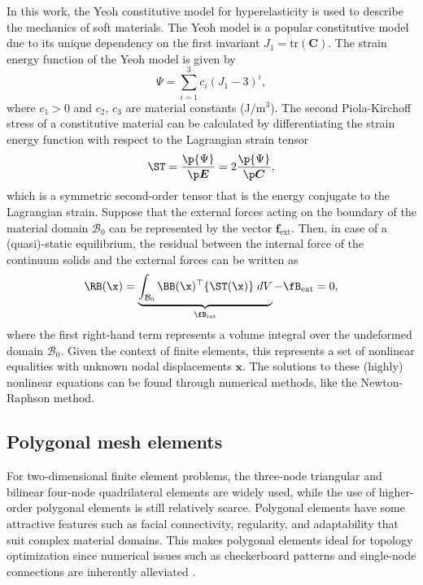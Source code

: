 In this work, the Yeoh constitutive model for hyperelasticity is used to describe the mechanics of soft materials. The Yeoh model is a popular constitutive model due to its unique dependency on the first invariant $J_1 = \text{tr}(\boldsymbol{C})$. The strain energy function of the Yeoh model \cite{Kim2018} is given by
%
\begin{equation}
{\Psi} = \sum_{i = 1}^{3} c_i (J_1 - 3)^i, 
\end{equation}
%
where $c_1 > 0$ and $c_2$, $c_3$ are material constants (J/m$^3$). The second Piola-Kirchoff stress of a constitutive material can be calculated by differentiating the strain energy function with respect to the Lagrangian strain tensor \cite{Renaud2011,Kim2018}
%
\begin{equation}
\ST = \frac{\p {\Psi}}{\p \boldsymbol{E}} = 2\frac{\p {\Psi}}{\p \boldsymbol{C}}, 
\label{eq:piola}
\end{equation}
%
which is a symmetric second-order tensor that is the energy conjugate to the Lagrangian strain. Suppose that the external forces acting on the boundary of the material domain $\mathcal{B}_0$ can be represented by the vector $\boldsymbol{f}_{\textrm{ext}}$. Then, in case of a (quasi)-static equilibrium, the residual between the internal force of the continuum solids and the external forces can be written as
%
\begin{equation}
\RB(\x) = \underbrace{\int_{\mathcal{B}_0} \BB(\x)^\top \{\ST(\x)\}  \; dV}_{\fB_\textrm{int}} -\fB_{\textrm{ext}} = 0, \label{eq:residual}
\end{equation} 
%
where the first right-hand term represents a volume integral over the undeformed domain $\mathcal{B}_0$. Given the context of finite elements, this represents a set of nonlinear equalities with unknown nodal displacements $\boldsymbol{x}$. The solutions to these (highly) nonlinear equations can be found through numerical methods, like the Newton-Raphson method. 

\subsection{Polygonal mesh elements}
For two-dimensional finite element problems, the three-node triangular and bilinear four-node quadrilateral elements are widely used, while the use of higher-order polygonal elements is still relatively scarce. Polygonal elements have some attractive features such as facial connectivity, regularity, and adaptability that suit complex material domains. This makes polygonal elements ideal for topology optimization since numerical issues such as checkerboard patterns and single-node connections are inherently alleviated \cite{Talischi2012, Gain2013}. 

